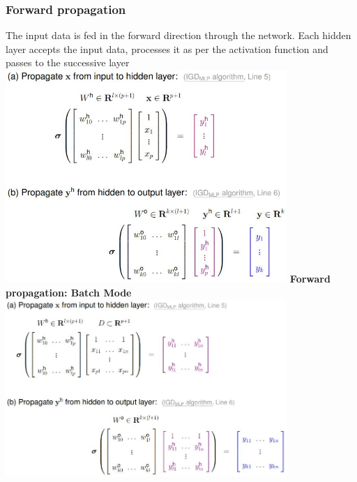 \documentclass[11pt,a4paper]{article}
\begin{document}
\begin{flushleft}
\subsubsection{Forward propagation}
The input data is fed in the forward direction through the network. Each hidden layer accepts the input data, processes it as per the activation function and passes to the successive layer
\includegraphics[width=0.8\textwidth]{forwardProp}
\textbf{Forward propagation: Batch Mode}
\includegraphics[width=0.8\textwidth]{forwardPropBatch}

\end{flushleft}
\end{document}
